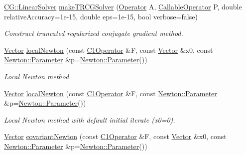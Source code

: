 \begin{DoxyCompactItemize}
\hyperlink{classSpacy_1_1CG_1_1LinearSolver}{C\+G\+::\+Linear\+Solver} \hyperlink{group__CGGroup_ga66f5afbc97e887274b28be9c94aa3103_ga66f5afbc97e887274b28be9c94aa3103}{make\+T\+R\+C\+G\+Solver} (\hyperlink{group__SpacyGroup_ga3f89622eba80cf840b2a7102f1303455_ga3f89622eba80cf840b2a7102f1303455}{Operator} A, \hyperlink{group__SpacyGroup_ga2b74020d806ad800795cdd97dab3466f_ga2b74020d806ad800795cdd97dab3466f}{Callable\+Operator} P, double relative\+Accuracy=1e-\/15, double eps=1e-\/15, bool verbose=false)
\begin{DoxyCompactList}\small\item\em Construct truncated regularized conjugate gradient method. \end{DoxyCompactList}\item 
\hyperlink{classSpacy_1_1Vector}{Vector} \hyperlink{group__NewtonGroup_ga448b8e78b2e84ed78e70c42114ea7599_ga448b8e78b2e84ed78e70c42114ea7599}{local\+Newton} (const \hyperlink{group__SpacyGroup_ga87ae8cb0d7a567a4bb181e0a9f182620_ga87ae8cb0d7a567a4bb181e0a9f182620}{C1\+Operator} \&F, const \hyperlink{classSpacy_1_1Vector}{Vector} \&x0, const \hyperlink{structSpacy_1_1Newton_1_1Parameter}{Newton\+::\+Parameter} \&p=\hyperlink{structSpacy_1_1Newton_1_1Parameter}{Newton\+::\+Parameter}())
\begin{DoxyCompactList}\small\item\em Local Newton method. \end{DoxyCompactList}\item 
\hyperlink{classSpacy_1_1Vector}{Vector} \hyperlink{group__NewtonGroup_gafbe5e25f46f7b0d237f5e9971cef998a_gafbe5e25f46f7b0d237f5e9971cef998a}{local\+Newton} (const \hyperlink{group__SpacyGroup_ga87ae8cb0d7a567a4bb181e0a9f182620_ga87ae8cb0d7a567a4bb181e0a9f182620}{C1\+Operator} \&F, const \hyperlink{structSpacy_1_1Newton_1_1Parameter}{Newton\+::\+Parameter} \&p=\hyperlink{structSpacy_1_1Newton_1_1Parameter}{Newton\+::\+Parameter}())
\begin{DoxyCompactList}\small\item\em Local Newton method with default initial iterate (x0=0). \end{DoxyCompactList}\item 
\hyperlink{classSpacy_1_1Vector}{Vector} \hyperlink{group__NewtonGroup_gab9d1c5b64e93d7ac051f8a7b41bf520a_gab9d1c5b64e93d7ac051f8a7b41bf520a}{covariant\+Newton} (const \hyperlink{group__SpacyGroup_ga87ae8cb0d7a567a4bb181e0a9f182620_ga87ae8cb0d7a567a4bb181e0a9f182620}{C1\+Operator} \&F, const \hyperlink{classSpacy_1_1Vector}{Vector} \&x0, const \hyperlink{structSpacy_1_1Newton_1_1Parameter}{Newton\+::\+Parameter} \&p=\hyperlink{structSpacy_1_1Newton_1_1Parameter}{Newton\+::\+Parameter}())

\end{DoxyCompactItemize}
